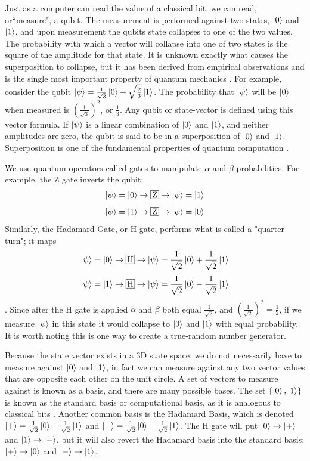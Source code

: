 Just as a computer can read the value of a classical bit, we can read, or``measure", a qubit.
The measurement is performed against two states, $\ket{0}$ and $\ket{1}$, and upon measurement the qubits state collapses to one of the two values.
The probability with which a vector will collapse into one of two states is the square of the amplitude for that state.
It is unknown exactly what causes the superposition to collapse, but it has been derived from empirical observations and is the single most important property of quantum mechanics \cite{qc:agi}.
For example, consider the qubit $\ket{\psi} = \frac{1}{\sqrt{3}}\ket{0} + \sqrt{\frac{2}{3}}\ket{1}$.
The probability that $\ket{\psi}$ will be $\ket{0}$ when measured is $(\frac{1}{\sqrt{3}})^2$, or $\frac{1}{3}$.
Any qubit or state-vector is defined using this vector formula.
If $\ket{\psi}$ is a linear combination of $\ket{0}$ and $\ket{1}$, and neither amplitudes are zero, the qubit is said to be in a superposition of $\ket{0}$ and $\ket{1}$.
Superposition is one of the fundamental properties of quantum computation \cite{qc:agi}. 

We use quantum operators called gates to manipulate $\alpha$ and $\beta$ probabilities.
For example, the Z gate inverts the qubit: $$\ket{\psi} = \ket{0} \rightarrow \textSq{Z} \rightarrow \ket{\psi} = \ket{1}$$ $$\ket{\psi} = \ket{1} \rightarrow \textSq{Z} \rightarrow \ket{\psi} = \ket{0}$$
Similarly, the Hadamard Gate, or H gate, performs what is called a "quarter turn"; it maps $$\ket{\psi} = \ket{0} \rightarrow \textSq{H} \rightarrow \ket{\psi} = \frac{1}{\sqrt{2}}\ket{0} + \frac{1}{\sqrt{2}}\ket{1}$$  $$\ket{\psi} = \ket{1} \rightarrow \textSq{H} \rightarrow \ket{\psi} = \frac{1}{\sqrt{2}}\ket{0} - \frac{1}{\sqrt{2}}\ket{1}$$ \cite{qc:agi}.
Since after the H gate is applied $\alpha$ and $\beta$ both equal $\frac{1}{\sqrt{2}}$, and ${(\frac{1}{\sqrt{2}})}^2 = \frac{1}{2}$, if we measure $\ket{\psi}$ in this state it would collapse to $\ket{0}$ and $\ket{1}$ with equal probability. 
It is worth noting this is one way to create a true-random number generator.

Because the state vector exists in a 3D state space, we do not necessarily have to measure against $\ket{0}$ and $\ket{1}$, in fact we can measure against any two vector values that are opposite each other on the unit circle. 
A set of vectors to measure against is known as a basis, and there are many possible bases. 
The set $\{\ket{0},\ket{1}\}$ is known as the standard basis or computational basis, as it is analogous to classical bits \cite{qcftgu}.
Another common basis is the Hadamard Basis, which is denoted $\ket{+} = \frac{1}{\sqrt{2}}\ket{0} + \frac{1}{\sqrt{2}}\ket{1}$ and $\ket{-} = \frac{1}{\sqrt{2}}\ket{0} - \frac{1}{\sqrt{2}}\ket{1}$.
The H gate will put $\ket{0} \rightarrow \ket{+}$ and $\ket{1} \rightarrow \ket{-}$, but it will also revert the Hadamard basis into the standard basis: $\ket{+} \rightarrow \ket{0}$ and $\ket{-} \rightarrow \ket{1}$.

